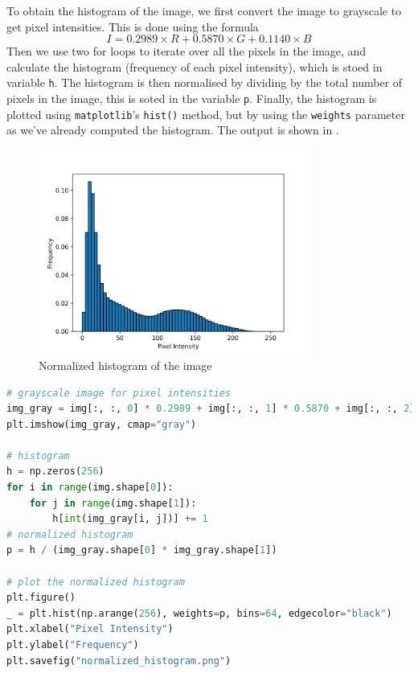 To obtain the histogram of the image, we first convert the image to grayscale to get pixel intensities.
This is done using the formula
\[I = 0.2989 \times R + 0.5870 \times G + 0.1140 \times B\]
Then we use two for loops to iterate over all the pixels in the image, and calculate the histogram (frequency of each pixel intensity), which is stoed in variable \texttt{h}.
The histogram is then normalised by dividing by the total number of pixels in the image, this is soted in the variable \texttt{p}.
Finally, the histogram is plotted using \texttt{matplotlib}'s \texttt{hist()} method, but by using the \texttt{weights} parameter as we've already computed the histogram.
The output is shown in .

\begin{figure}[H]
	\centering
	\includegraphics[width=0.8\textwidth]{img/normalized_histogram.png}
	\caption{Normalized histogram of the image}
	\label{fig:normalized_histogram}
\end{figure}

\begin{lstlisting}[language=Python, caption={Continuation of Listing \ref{lst:correlation}, to compute and plot the normalised histogram}]
# grayscale image for pixel intensities
img_gray = img[:, :, 0] * 0.2989 + img[:, :, 1] * 0.5870 + img[:, :, 2] * 0.1140
plt.imshow(img_gray, cmap="gray")

# histogram
h = np.zeros(256)
for i in range(img.shape[0]):
    for j in range(img.shape[1]):
        h[int(img_gray[i, j])] += 1
# normalized histogram
p = h / (img_gray.shape[0] * img_gray.shape[1])

# plot the normalized histogram
plt.figure()
_ = plt.hist(np.arange(256), weights=p, bins=64, edgecolor="black")
plt.xlabel("Pixel Intensity")
plt.ylabel("Frequency")
plt.savefig("normalized_histogram.png")
\end{lstlisting}
